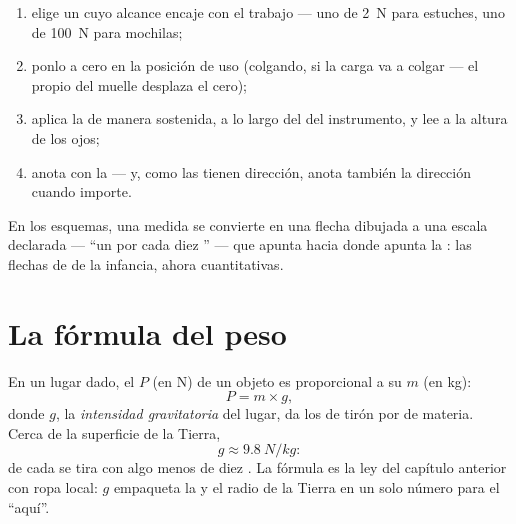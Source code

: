 \begin{method}\label{met:g9:weight-vs-mass:measure}
\begin{enumerate}
  \item elige un  cuyo alcance encaje con el trabajo
        --- uno de \qty{2}{N} para estuches, uno de \qty{100}{N}
        para mochilas;
  \item ponlo a cero en la posición de uso (colgando, si la carga va
        a colgar --- el propio  del muelle desplaza el cero);
  \item aplica la  de manera sostenida, a lo largo del 
        del instrumento, y lee a la altura de los ojos;
  \item anota con la  --- y, como las
         tienen dirección, anota también la dirección
        cuando importe.
\end{enumerate}
En los esquemas, una  medida se convierte en una flecha
dibujada a una escala declarada --- ``un  por cada diez
'' --- que apunta hacia donde apunta la
: las flechas de  de la infancia, ahora
cuantitativas.
\end{method}

\section{La fórmula del peso}

\begin{proposition}\label{prop:g9:weight-vs-mass:formula}
En un lugar dado, el  $P$ (en \unit{N}) de un objeto es
proporcional a su  $m$ (en \unit{kg}):
\[
P = m \times g ,
\]
donde $g$, la \emph{intensidad gravitatoria} del lugar, da los  de tirón por
 de materia. Cerca de la superficie de la Tierra,
\[
g \approx \qty{9.8}{N/kg}:
\]
de cada  se tira con algo menos de diez
. La fórmula es la ley del capítulo anterior con ropa
local: $g$ empaqueta la  y el radio de la Tierra en un solo
número para el ``aquí''.
\end{proposition}

